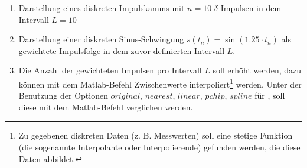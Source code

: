 \begin{enumerate}[label=\alph*)]
	\item Darstellung eines diskreten Impulskamms mit $n=10$ $\delta$-Impulsen in dem Intervall $L=10$ \\
	
	\item Darstellung einer diskreten Sinus-Schwingung $s(t_n) = \sin(\num{1,25} \cdot{t_n})$ als gewichtete Impulsfolge in dem zuvor definierten Intervall $L$. \\
	
	\item Die Anzahl der gewichteten Impulsen pro Intervall $L$ soll erhöht werden, dazu können mit dem Matlab-Befehl  Zwischenwerte interpoliert\footnote{Zu gegebenen diskreten Daten (z. B. Messwerten) soll eine stetige Funktion (die sogenannte Interpolante oder Interpolierende) gefunden werden, die diese Daten abbildet.} werden. Unter der Benutzung der Optionen $original$, $nearest$, $linear$, $pchip$, $spline$ für , soll diese mit dem Matlab-Befehl  verglichen werden. \\
\end{enumerate}